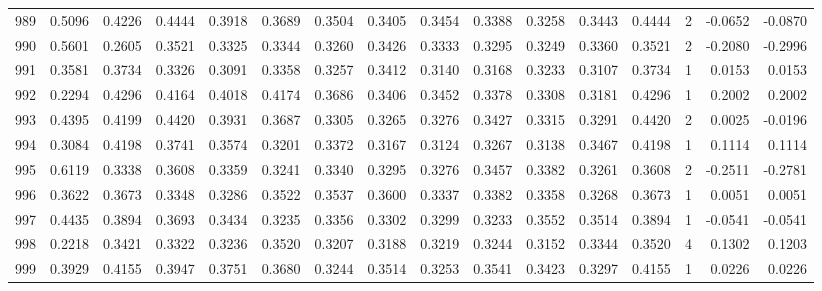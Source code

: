 \begin{tabular}{lrrrrrrrrrrrrrrr}
989 &      0.5096 &  0.4226 &  0.4444 &  0.3918 &  0.3689 &  0.3504 &  0.3405 &  0.3454 &  0.3388 &  0.3258 &   0.3443 &     0.4444 &      2 &                   -0.0652 &                    -0.0870 \\
990 &      0.5601 &  0.2605 &  0.3521 &  0.3325 &  0.3344 &  0.3260 &  0.3426 &  0.3333 &  0.3295 &  0.3249 &   0.3360 &     0.3521 &      2 &                   -0.2080 &                    -0.2996 \\
991 &      0.3581 &  0.3734 &  0.3326 &  0.3091 &  0.3358 &  0.3257 &  0.3412 &  0.3140 &  0.3168 &  0.3233 &   0.3107 &     0.3734 &      1 &                    0.0153 &                     0.0153 \\
992 &      0.2294 &  0.4296 &  0.4164 &  0.4018 &  0.4174 &  0.3686 &  0.3406 &  0.3452 &  0.3378 &  0.3308 &   0.3181 &     0.4296 &      1 &                    0.2002 &                     0.2002 \\
993 &      0.4395 &  0.4199 &  0.4420 &  0.3931 &  0.3687 &  0.3305 &  0.3265 &  0.3276 &  0.3427 &  0.3315 &   0.3291 &     0.4420 &      2 &                    0.0025 &                    -0.0196 \\
994 &      0.3084 &  0.4198 &  0.3741 &  0.3574 &  0.3201 &  0.3372 &  0.3167 &  0.3124 &  0.3267 &  0.3138 &   0.3467 &     0.4198 &      1 &                    0.1114 &                     0.1114 \\
995 &      0.6119 &  0.3338 &  0.3608 &  0.3359 &  0.3241 &  0.3340 &  0.3295 &  0.3276 &  0.3457 &  0.3382 &   0.3261 &     0.3608 &      2 &                   -0.2511 &                    -0.2781 \\
996 &      0.3622 &  0.3673 &  0.3348 &  0.3286 &  0.3522 &  0.3537 &  0.3600 &  0.3337 &  0.3382 &  0.3358 &   0.3268 &     0.3673 &      1 &                    0.0051 &                     0.0051 \\
997 &      0.4435 &  0.3894 &  0.3693 &  0.3434 &  0.3235 &  0.3356 &  0.3302 &  0.3299 &  0.3233 &  0.3552 &   0.3514 &     0.3894 &      1 &                   -0.0541 &                    -0.0541 \\
998 &      0.2218 &  0.3421 &  0.3322 &  0.3236 &  0.3520 &  0.3207 &  0.3188 &  0.3219 &  0.3244 &  0.3152 &   0.3344 &     0.3520 &      4 &                    0.1302 &                     0.1203 \\
999 &      0.3929 &  0.4155 &  0.3947 &  0.3751 &  0.3680 &  0.3244 &  0.3514 &  0.3253 &  0.3541 &  0.3423 &   0.3297 &     0.4155 &      1 &                    0.0226 &                     0.0226 \\
\bottomrule
\end{tabular}
